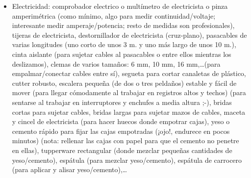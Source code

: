 \documentclass[spanish,10pt,a4paper,final,oneside]{article}
\begin{document}
\begin{itemize}
\item Electricidad: comprobador electrico o multímetro de electricista o pinza amperimétrica (como mínimo, algo para medir continuidad/voltaje; interesante medir amperaje/potencia; resto de medidas son profesionales), tijeras de electricista, destornillador de electricista (cruz-plano), pasacables de varias longitudes (uno corto de unos 3 m. y uno más largo de unos 10 m.), cinta aislante (para sujetar cables al pasacables o entre ellos mientras los deslizamos), clemas de varios tamaños: 6 mm, 10 mm, 16 mm,\ldots (para empalmar/conectar cables entre sí), segueta para cortar canaletas de plástico, cutter robusto, escalera pequeña (de dos o tres peldaños) estable y fácil de mover (para llegar cómodamente al trabajar en registros altos y techos) (para sentarse al trabajar en interruptores y enchufes a media altura ;-), bridas cortas para sujetar cables, bridas largas para sujetar mazos de cables, maceta y cincel de electricista (para hacer huecos donde empotrar cajas), yeso o cemento rápido para fijar las cajas empotradas (¡ojo!, endurece en pocos minutos) (nota: rellenar las cajas con papel para que el cemento no penetre en ellas), tupperware rectangular (donde mezclar pequeñas cantidades de yeso/cemento), espátula (para mezclar yeso/cemento), espátula de carrocero (para aplicar y alisar yeso/cemento),\ldots

\end{itemize}
\end{document}
